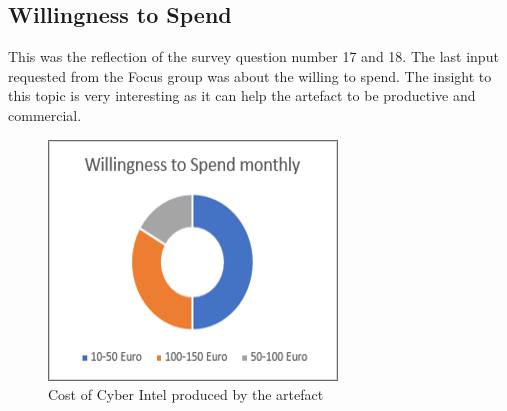\subsection{Willingness to Spend}
\label{sec:pay}
This was the reflection of the survey question number 17 and 18. The last input requested from the Focus group was about the willing to spend.  
The insight to this topic is very interesting as it can help the artefact to be productive and commercial.
\begin{figure}[ht]
    \centering
    \includegraphics[scale=0.6]{Figures/product-cost.png}
    \caption{Cost of Cyber Intel produced by the  artefact}
    \label{fig:product-cost}
\end{figure}
 \FloatBarrier

